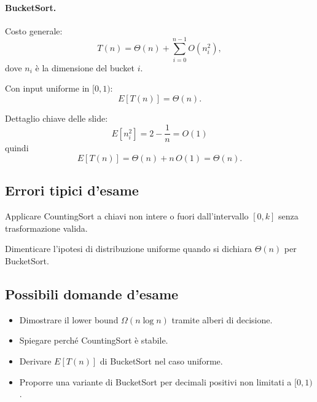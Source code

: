 \paragraph{BucketSort.}
Costo generale:
\[
T(n)=\Theta(n)+\sum_{i=0}^{n-1}O(n_i^2),
\]
dove $n_i$ è la dimensione del bucket $i$.

Con input uniforme in $[0,1)$:
\[
E[T(n)] = \Theta(n).
\]

Dettaglio chiave delle slide:
\[
E[n_i^2]=2-\frac{1}{n}=O(1)
\]
quindi
\[
E[T(n)]=\Theta(n)+n\,O(1)=\Theta(n).
\]

\subsection{Errori tipici d'esame}
\begin{hardnote}
Applicare CountingSort a chiavi non intere o fuori dall'intervallo $[0,k]$ senza trasformazione valida.
\end{hardnote}

\begin{hardnote}
Dimenticare l'ipotesi di distribuzione uniforme quando si dichiara $\Theta(n)$ per BucketSort.
\end{hardnote}

\subsection{Possibili domande d'esame}
\begin{itemize}
	\item Dimostrare il lower bound $\Omega(n\log n)$ tramite alberi di decisione.
	\item Spiegare perché CountingSort è stabile.
	\item Derivare $E[T(n)]$ di BucketSort nel caso uniforme.
	\item Proporre una variante di BucketSort per decimali positivi non limitati a $[0,1)$.
\end{itemize}